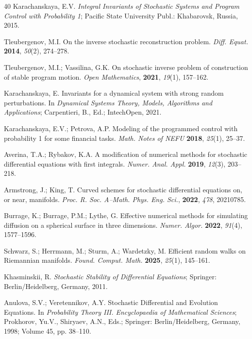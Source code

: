 \documentclass[10pt,reqno]{amsart}
\theoremstyle{plain}
\theoremstyle{remark}
\begin{document}
\begin{thebibliography}{40}
Karachanskaya, E.V. {\em Integral Invariants of Stochastic Systems and Program Control with Probability 1}; Pacific State University Publ.: Khabarovsk, Russia, 2015.

Tleubergenov, M.I. On the inverse stochastic reconstruction problem. {\em Diff. Equat.} {\bf 2014}, {\em 50}(2), 274--278. %

Tleubergenov, M.I.; Vassilina, G.K. On stochastic inverse problem of construction of stable program motion. {\em Open Mathematics}, {\bf 2021}, {\em 19}(1), 157--162. %

Karachanskaya, E. Invariants for a dynamical system with strong random perturbations. In {\em Dynamical Systems Theory, Models, Algorithms and Applications}; Carpentieri, B., Ed.; IntechOpen, 2021. %

Karachanskaya, E.V.; Petrova, A.P. Modeling of the programmed control with probability 1 for some financial tasks. {\em Math. Notes of NEFU} {\bf 2018}, {\em 25}(1), 25--37. %

Averina, T.A.; Rybakov, K.A. A modification of numerical methods for stochastic differential equations with first integrals. {\em Numer. Anal. Appl.} {\bf 2019}, {\em 12}(3), 203--218. %

Armstrong, J.; King, T. Curved schemes for stochastic differential equations on, or near, manifolds. {\em Proc. R. Soc. A--Math. Phys. Eng. Sci.}, {\bf 2022}, {\em 478}, 20210785. %

Burrage, K.; Burrage, P.M.; Lythe, G. Effective numerical methods for simulating diffusion on a spherical surface in three dimensions. {\em Numer. Algor.} {\bf 2022}, {\em 91}(4), 1577--1596. %

Schwarz, S.; Herrmann, M.; Sturm, A.; Wardetzky, M. Efficient random walks on Riemannian manifolds. {\em Found. Comput. Math.} {\bf 2025}, {\em 25}(1), 145--161. %

Khasminskii, R. {\em Stochastic Stability of Differential Equations}; Springer: Berlin/Heidelberg, Germany, 2011.

Anulova, S.V.; Veretennikov, A.Y. Stochastic Differential and Evolution Equations. In {\em Probability Theory III. Encyclopaedia of Mathematical Sciences}; Prokhorov, Yu.V., Shiryaev, A.N., Eds.; Springer: Berlin/Heidelberg, Germany, 1998; Volume 45, pp. 38--110. %


\end{thebibliography}
\end{document}

